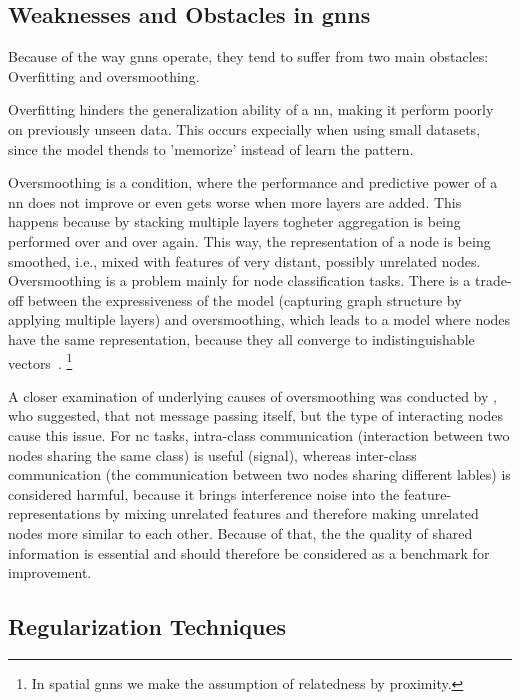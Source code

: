 \subsection{Weaknesses and Obstacles in \acp{gnn}}
\label{sec:related:pred:typical}
Because of the way \acp{gnn} operate, they tend to suffer from two main obstacles:
Overfitting and oversmoothing.

Overfitting hinders the generalization ability of a \acf{nn}, making it perform poorly
on previously unseen data. This occurs expecially when using small datasets, since the model thends to 'memorize' instead of learn the pattern.

Oversmoothing is a condition, where the performance and predictive power of a \ac{nn}
does not improve or even gets worse when more layers are added. This happens because
by stacking multiple layers  togheter aggregation is being performed over and over again.
This way, the representation of a node is being smoothed, i.e., mixed with features of
very distant, possibly unrelated nodes. Oversmoothing is a problem mainly for node classification tasks. There is a trade-off between the expressiveness of the model (capturing graph structure by applying multiple layers) and oversmoothing, which leads
to a model where nodes have the same representation, because they all converge to indistinguishable vectors~\cite{Zhou2020,Hasanzadeh2020}.%
\footnote{In spatial \acp{gnn} we make the assumption of relatedness by proximity.}

A closer examination of underlying causes of oversmoothing was conducted by \citet{Chen2020}, who suggested, that not message passing itself, but the type of interacting nodes cause this issue.
For \acf{nc} tasks, intra-class communication (interaction between two nodes sharing the same class) is useful (signal), whereas inter-class communication (the communication between two nodes sharing different lables) is considered harmful, because it brings interference noise into the feature-representations by mixing unrelated features and therefore making unrelated nodes more similar to each other. Because of that, the the quality of shared information is essential and should therefore be considered as a benchmark for improvement.


\subsection{Regularization Techniques}
\label{sec:related:pred:regularization}

